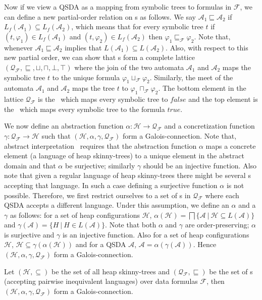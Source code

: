 \documentclass{llncs}
\newcommand{\lub}{\sqcup}
\newcommand{\glb}{\sqcap}
\newcommand{\true}{\textit{true}}
\newcommand{\false}{\textit{false}}
\newcommand{\A}{\mathcal{A}}
\newcommand{\heap}{H}
\newcommand{\F}{\mathcal{F}}
\newcommand{\HC}{\mathcal{H}}
\begin{document}
Now if we view a QSDA as a mapping from symbolic trees to formulas in $\F$, we can define a new partial-order relation on \QSDA s as follows. We say $\A_1 \sqsubseteq \A_2$ if $L_f(\A_1) \subseteq L_f(\A_2)$, which means that for every symbolic tree $t$ if $(t, \varphi_1) \in L_f(\A_1)$ and $(t, \varphi_2) \in L_f(\A_2)$ then $\varphi_1 \sqsubseteq_\F \varphi_2$.
Note that, whenever $\A_1 \sqsubseteq \A_2$ implies that $L(\A_1) \subseteq L(\A_2)$.
Also, with respect to this new partial order, we can show that \QSDA s form a complete lattice $(\mathcal{Q_F}, \sqsubseteq, \lub, \glb, \bot, \top)$ where the join of the two automata $\A_1$ and $\A_2$ maps the symbolic tree $t$ to the unique formula $\varphi_1 \lub_\F \varphi_2$. Similarly, the meet of the automata $\A_1$ and $\A_2$ maps the tree $t$ to $\varphi_1 \glb_\F \varphi_2$.
The bottom element in the lattice $\mathcal{Q_F}$ is the \QSDA\ which maps every symbolic tree to $\false$ and the top element is the \QSDA\ which maps every symbolic tree to the formula $\true$.



We now define an abstraction function $\alpha: \HC \rightarrow \mathcal{Q_F}$ and a concretization function $\gamma: \mathcal{Q_F} \rightarrow \HC$ such that $(\HC, \alpha, \gamma, \mathcal{Q_F})$ form a Galois-connection.
Note that, abstract interpretation~\cite{cc77} requires that the abstraction function $\alpha$ maps a concrete element (a language of heap skinny-trees) to a unique element in the abstract domain and that $\alpha$ be surjective; similarly $\gamma$ should be an injective function.
Also note that given a regular language of heap skinny-trees there might be several \QSDA s accepting that language. In such a case defining a surjective function $\alpha$ is not possible.
Therefore,
we first restrict ourselves to a set of \QSDA s in $\mathcal{Q_F}$ where each QSDA accepts a different language.
Under this assumption, we define an $\alpha$ and a $\gamma$ as follows: for a set of heap configurations $\HC$, $\alpha(\HC) = \bigsqcap \{\A ~ | ~ \HC \subseteq L(\A)\} $
and $\gamma(\A) = \{\heap ~ | ~ \heap \in L(\A) \}$.
Note that both $\alpha$ and $\gamma$ are order-preserving; $\alpha$ is surjective and $\gamma$ is an injective function. Also for a set of heap configurations $\mathcal{H}$, $\mathcal{H} \subseteq \gamma(\alpha(\mathcal{H}))$ and for a QSDA $\A$, $\A = \alpha(\gamma(\A))$.
Hence $(\HC, \alpha, \gamma, \mathcal{Q_F})$ form a Galois-connection.
\begin{theorem}
Let $(\HC, \subseteq)$ be the set of all heap skinny-trees and $(\mathcal{Q_F}, \sqsubseteq)$ be the set of \QSDA s (accepting pairwise inequivalent languages) over data formulas $\F$, then $(\HC, \alpha, \gamma, \mathcal{Q_F})$ form a Galois-connection.
\end{theorem}
\end{document}
